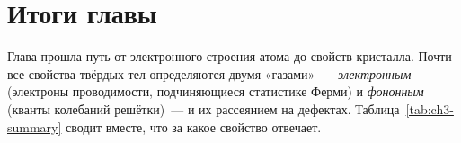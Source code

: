 \clearpage
\section*{Итоги главы}

Глава прошла путь от электронного строения атома до свойств кристалла.
Почти все свойства твёрдых тел определяются двумя «газами»~—
\emph{электронным} (электроны проводимости, подчиняющиеся статистике
Ферми) и \emph{фононным} (кванты колебаний решётки)~— и их рассеянием на
дефектах. Таблица~\ref{tab:ch3-summary} сводит вместе, что за какое
свойство отвечает.

